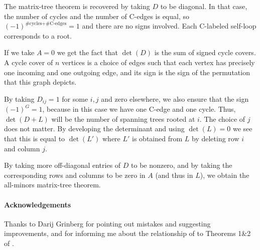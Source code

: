 \documentclass[a4paper, 11pt]{article}
\theoremstyle{definition}
\begin{document}
The matrix-tree theorem is recovered by taking $D$ to be diagonal. In that case, the number of cycles and the number of C-edges is equal, so $(-1)^{\text{\#cycles} + \text{\#C-edges}} = 1$ and there are no signs involved. Each C-labeled self-loop corresponds to a root.

If we take $A=0$ we get the fact that $\det(D)$ is the sum of signed cycle covers. A cycle cover of $n$ vertices is a choice of edges such that each vertex has precisely one incoming and one outgoing edge, and its sign is the sign of the permutation that this graph depicts.

By taking $D_{ij} = 1$ for some $i,j$ and zero elsewhere, we also ensure that the sign $(-1)^G = 1$, because in this case we have one C-edge and one cycle. Thus, $\det(D+L)$ will be the number of spanning trees rooted at $i$. The choice of $j$ does not matter. By developing the determinant and using $\det(L) = 0$ we see that this is equal to $\det(L')$ where $L'$ is obtained from $L$ by deleting row $i$ and column $j$.

By taking more off-diagonal entries of $D$ to be nonzero, and by taking the corresponding rows and columns to be zero in $A$ (and thus in $L$), we obtain the all-minors matrix-tree theorem.

\paragraph{Acknowledgements}
Thanks to Darij Grinberg for pointing out mistakes and suggesting improvements, and for informing me about the relationship of  to Theorems 1\&2 of \cite{Rote2001}.



\end{document}
